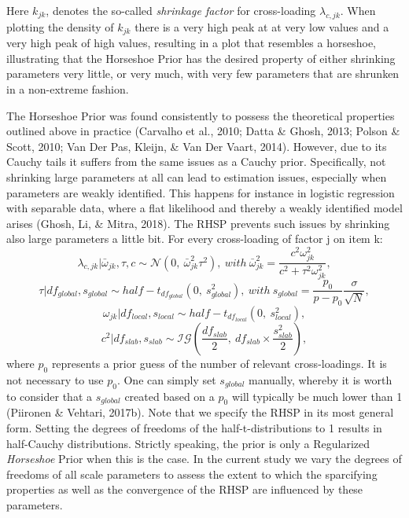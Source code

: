 \documentclass[
  man, donotrepeattitle,floatsintext]{apa6}
\begin{document}
Here \(k_{jk}\), denotes the so-called \emph{shrinkage factor} for cross-loading \(\lambda_{c,jk}\).
When plotting the density of \(k_{jk}\) there is a very high peak at at very low values and a very high peak of high values, resulting in a plot that resembles a horseshoe, illustrating that the Horseshoe Prior has the desired property of either shrinking parameters very little, or very much, with very few parameters that are shrunken in a non-extreme fashion.

The Horseshoe Prior was found consistently to possess the theoretical properties outlined above in practice (Carvalho et al., 2010; Datta \& Ghosh, 2013; Polson \& Scott, 2010; Van Der Pas, Kleijn, \& Van Der Vaart, 2014). However, due to its Cauchy tails it suffers from the same issues as a Cauchy prior. Specifically, not shrinking large parameters at all can lead to estimation issues, especially when parameters are weakly identified. This happens for instance in logistic regression with separable data, where a flat likelihood and thereby a weakly identified model arises (Ghosh, Li, \& Mitra, 2018). The RHSP prevents such issues by shrinking also large parameters a little bit. For every cross-loading of factor j on item k:
\[\lambda_{c,jk} | \bar{\omega}_{jk}, \tau, c\sim \mathcal{N}(0, \ \bar{\omega}^2_{jk} \tau^2), \ with \ \bar{\omega}^2_{jk} = \frac{c^2\omega_{jk}^2}{c^2 + \tau^2 \omega_{jk}^2},\]
\[\tau | df_{global}, s_{global} \sim half-t_{df_{global}}(0,\  s_{global}^2), \ with \  s_{global} = \frac{p_0}{p-p_0}\frac{\sigma}{\sqrt{N}},\]
\[\omega_{jk}| df_{local}, s_{local} \sim half-t_{df_{local}}(0, \ s_{local}^2),\]
\[c^2 | df_{slab}, s_{slab} \sim \mathcal{IG}(\frac{df_{slab}}{2}, \  df_{slab} \times \frac{s_{slab}^2}{2}),\]
where \(p_0\) represents a prior guess of the number of relevant cross-loadings. It is not necessary to use \(p_0\). One can simply set \(s_{global}\) manually, whereby it is worth to consider that a \(s_{global}\) created based on a \(p_0\) will typically be much lower than 1 (Piironen \& Vehtari, 2017b). Note that we specify the RHSP in its most general form. Setting the degrees of freedoms of the half-t-distributions to 1 results in half-Cauchy distributions. Strictly speaking, the prior is only a Regularized \emph{Horseshoe} Prior when this is the case. In the current study we vary the degrees of freedoms of all scale parameters to assess the extent to which the sparcifying properties as well as the convergence of the RHSP are influenced by these parameters.
\end{document}
